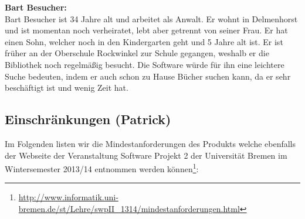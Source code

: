 \documentclass[fontsize=12pt,paper=a4,twoside]{scrartcl}
\begin{document}
\bigskip

\textbf{Bart Besucher:}\\
Bart Besucher ist 34 Jahre alt und arbeitet als Anwalt. Er wohnt in Delmenhorst und ist momentan noch verheiratet, lebt aber getrennt von seiner Frau. Er hat einen Sohn, welcher noch in den Kindergarten geht und 5 Jahre alt ist. Er ist früher an der Oberschule Rockwinkel zur Schule gegangen, weshalb er die Bibliothek noch regelmäßig besucht. Die Software würde für ihn eine leichtere Suche bedeuten, indem er auch schon zu Hause Bücher suchen kann, da er sehr beschäftigt ist und wenig Zeit hat.\\

\subsection{Einschränkungen (Patrick)}
\label{sec:Einschraenkungen}
Im Folgenden listen wir die Mindestanforderungen des Produkts welche ebenfalls der Webseite der Veranstaltung Software Projekt 2 der Universität Bremen im Wintersemester 2013/14 entnommen werden können\footnote{\url{http://www.informatik.uni-bremen.de/st/Lehre/swpII_1314/mindestanforderungen.html}}:
\end{document}
